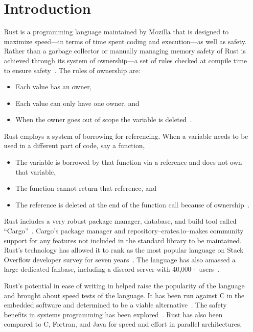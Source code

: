 \documentclass[10pt]{IEEEtran}
\begin{document}
\section{Introduction}
Rust is a programming language maintained by Mozilla that is designed to maximize speed---in terms of time spent coding and 
execution---as well as safety. Rather than a garbage collector or manually managing memory safety of Rust is achieved 
through its system of ownership---a set of rules checked at compile time to ensure safety~\cite{rust2023}. The rules of ownership are:
\begin{itemize}
    \item Each value has an owner,
    \item Each value can only have one owner, and
    \item When the owner goes out of scope the variable is deleted~\cite{rust2023}.
\end{itemize}
Rust employs a system of borrowing for referencing. When a variable needs to be used in a different part of code, say a function, 
\begin{itemize}
    \item The variable is borrowed by that function via a reference and does not own that variable,
    \item The function cannot return that reference, and
    \item The reference is deleted at the end of the function call because of ownership~\cite{rust2023}.
\end{itemize}
Rust includes a very robust package manager, database, and build tool called “Cargo”~\cite{cargobook}. 
Cargo's package manager and repository--crates.io--makes community support for any features not included in the standard library to be maintained.
Rust's technology has allowed it to rank as the most popular language on Stack Overflow developer survey for seven years~\cite{stackoverflow2022}. 
The language has also amassed a large dedicated fanbase, including a discord server with 40,000+ users~\cite{discord}.
\par
Rust's potential in ease of writing in helped raise the popularity of the language and brought about speed tests of the language. 
It has been run against C in the embedded software and determined to be a viable alternative~\cite{BalasubramanianProceedings}. 
The safety benefits in systems programming has been explored~\cite{BalasubramanianProceedings}. 
Rust has also been compared to C, Fortran, and Java for speed and effort in parallel architectures, 
\end{document}
